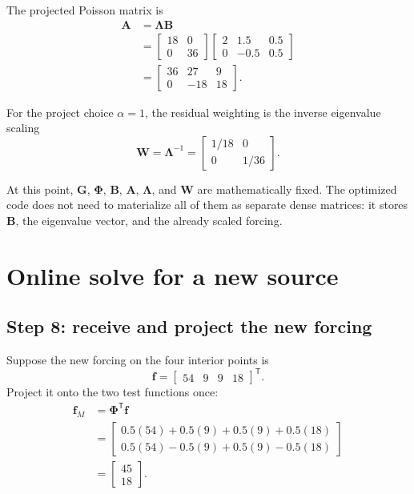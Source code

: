 \documentclass[11pt]{article}
\newcommand{\mat}[1]{\mathbf{#1}}
\newcommand{\vect}[1]{\mathbf{#1}}
\begin{document}
The projected Poisson matrix is
\begin{align}
  \mat{A}
  &=\mat{\Lambda}\mat{B}\\
  &=\begin{bmatrix}18&0\\0&36\end{bmatrix}
    \begin{bmatrix}2&1.5&0.5\\0&-0.5&0.5\end{bmatrix}\\
  &=\begin{bmatrix}
      36& 27& 9\\
       0&-18&18
    \end{bmatrix}.
\end{align}

For the project choice $\alpha=1$, the residual weighting is the inverse
eigenvalue scaling
\begin{equation}
  \mat{W}=\mat{\Lambda}^{-1}
  =\begin{bmatrix}1/18&0\\0&1/36\end{bmatrix}.
\end{equation}

At this point, $\mat{G}$, $\mat{\Phi}$, $\mat{B}$, $\mat{A}$,
$\mat{\Lambda}$, and $\mat{W}$ are mathematically fixed.  The optimized code
does not need to materialize all of them as separate dense matrices: it stores
$\mat{B}$, the eigenvalue vector, and the already scaled forcing.

\section{Online solve for a new source}

\subsection{Step 8: receive and project the new forcing}

Suppose the new forcing on the four interior points is
\begin{equation}
  \vect{f}=\begin{bmatrix}54&9&9&18\end{bmatrix}^{\mathsf T}.
\end{equation}
Project it onto the two test functions once:
\begin{align}
  \vect{f}_M
  &=\mat{\Phi}^{\mathsf T}\vect{f}\\
  &=\begin{bmatrix}
      0.5(54)+0.5(9)+0.5(9)+0.5(18)\\
      0.5(54)-0.5(9)+0.5(9)-0.5(18)
    \end{bmatrix}\\
  &=\begin{bmatrix}45\\18\end{bmatrix}.
\end{align}
\end{document}
